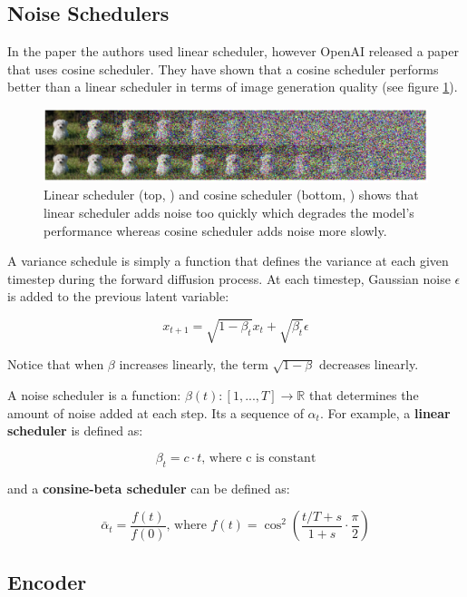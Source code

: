 



\subsection{Noise Schedulers}

In the paper \cite{ddpm} the authors used linear scheduler, however OpenAI released a paper \cite{openai_improved_ddpm} that uses cosine scheduler. They have shown that a cosine scheduler performs better than a linear scheduler in terms of image generation quality (see figure \ref{fig:linear_cosine_scheduler}).

\begin{figure}
    \centering
    \includegraphics[width=1\textwidth]{images/diffusion_models/linear_cosine_scheduler.png}
    \caption{Linear scheduler (top, \cite{ddpm}) and cosine scheduler (bottom, \cite{openai_improved_ddpm}) shows that linear scheduler adds noise too quickly which degrades the model's performance whereas cosine scheduler adds noise more slowly.}
    \label{fig:linear_cosine_scheduler}
\end{figure}

A variance schedule is simply a function that defines the variance at each given timestep during the forward diffusion process. At each timestep, Gaussian noise $\epsilon$ is added to the previous latent variable:

\[
    x_{t+1} = \sqrt{1 - \beta_t} x_t + \sqrt{\beta_t} \epsilon
\]

Notice that when $\beta$ increases linearly, the term $\sqrt{1-\beta}$ decreases linearly. 

A noise scheduler is a function: $\beta(t):[1, ..., T] \rightarrow \mathbb{R}$ that determines the amount of noise added at each step. Its a sequence of $\alpha_t$. For example, a \textbf{linear scheduler} is defined as:

\[
    \beta_t = c \cdot t \text{, where c is constant}
\]

and a \textbf{consine-beta scheduler} can be defined as:

\[
    \bar{\alpha}_t = \frac{f(t)}{f(0)} \text{, where } f(t) = \cos^2(\frac{t/T + s}{1+s} \cdot \frac{\pi}{2})
\]


\subsection{Encoder}

